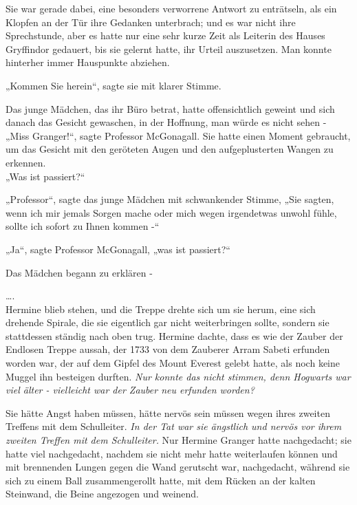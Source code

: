 {Sie war gerade dabei, eine besonders verworrene Antwort zu enträtseln, als ein Klopfen an der Tür ihre Gedanken unterbrach; und es war nicht ihre Sprechstunde, aber es hatte nur eine sehr kurze Zeit als Leiterin des Hauses Gryffindor gedauert, bis sie gelernt hatte, ihr Urteil auszusetzen. Man konnte hinterher immer Hauspunkte abziehen.

„Kommen Sie herein“, sagte sie mit klarer Stimme.

Das junge Mädchen, das ihr Büro betrat, hatte offensichtlich geweint und sich danach das Gesicht gewaschen, in der Hoffnung, man würde es nicht sehen -\\ „Miss Granger!“, sagte Professor McGonagall. Sie hatte einen Moment gebraucht, um das Gesicht mit den geröteten Augen und den aufgeplusterten Wangen zu erkennen.\\ „Was ist passiert?“

„Professor“, sagte das junge Mädchen mit schwankender Stimme, „Sie sagten, wenn ich mir jemals Sorgen mache oder mich wegen irgendetwas unwohl fühle, sollte ich sofort zu Ihnen kommen -“

„Ja“, sagte Professor McGonagall, „was ist passiert?“

Das Mädchen begann zu erklären -

….\\ Hermine blieb stehen, und die Treppe drehte sich um sie herum, eine sich drehende Spirale, die sie eigentlich gar nicht weiterbringen sollte, sondern sie stattdessen ständig nach oben trug. Hermine dachte, dass es wie der Zauber der Endlosen Treppe aussah, der 1733 von dem Zauberer Arram Sabeti erfunden worden war, der auf dem Gipfel des Mount Everest gelebt hatte, als noch keine Muggel ihn besteigen durften. \emph{Nur konnte das nicht stimmen, denn Hogwarts war viel älter - vielleicht war der Zauber neu erfunden worden?}

Sie hätte Angst haben müssen, hätte nervös sein müssen wegen ihres zweiten Treffens mit dem Schulleiter. \emph{In der Tat war sie ängstlich und nervös vor ihrem zweiten Treffen mit dem Schulleiter.} Nur Hermine Granger hatte nachgedacht; sie hatte viel nachgedacht, nachdem sie nicht mehr hatte weiterlaufen können und mit brennenden Lungen gegen die Wand gerutscht war, nachgedacht, während sie sich zu einem Ball zusammengerollt hatte, mit dem Rücken an der kalten Steinwand, die Beine angezogen und weinend.

}

